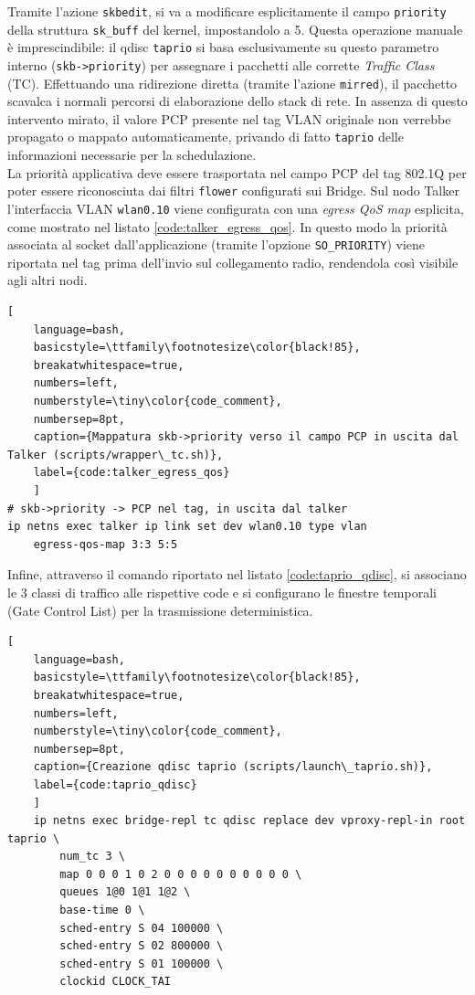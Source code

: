 \documentclass[12pt,a4paper,twoside]{book}
\begin{document}
\begin{onehalfspace}
Tramite l'azione \texttt{skbedit}, si va a modificare esplicitamente il campo \texttt{priority} della struttura \texttt{sk\_buff} del kernel, impostandolo a 5. Questa operazione manuale è imprescindibile: il qdisc \texttt{taprio} si basa esclusivamente su questo parametro interno (\texttt{skb->priority}) per assegnare i pacchetti alle corrette \textit{Traffic Class} (TC). Effettuando una ridirezione diretta (tramite l'azione \texttt{mirred}), il pacchetto scavalca i normali percorsi di elaborazione dello stack di rete. In assenza di questo intervento mirato, il valore PCP presente nel tag VLAN originale non verrebbe propagato o mappato automaticamente, privando di fatto \texttt{taprio} delle informazioni necessarie per la schedulazione.
\\
La priorità applicativa deve essere trasportata nel campo PCP del tag 802.1Q per
poter essere riconosciuta dai filtri \texttt{flower} configurati sui Bridge.
Sul nodo Talker l'interfaccia VLAN \texttt{wlan0.10} viene configurata con una
\textit{egress QoS map} esplicita, come mostrato nel listato
\ref{code:talker_egress_qos}. In questo modo la priorità associata al socket
dall'applicazione (tramite l'opzione \texttt{SO\_PRIORITY}) viene riportata nel
tag prima dell'invio sul collegamento radio, rendendola così visibile agli altri nodi.

\begin{lstlisting}[
    language=bash,
    basicstyle=\ttfamily\footnotesize\color{black!85},
    breakatwhitespace=true,
    numbers=left,
    numberstyle=\tiny\color{code_comment},
    numbersep=8pt,
    caption={Mappatura skb->priority verso il campo PCP in uscita dal Talker (scripts/wrapper\_tc.sh)},
    label={code:talker_egress_qos}
    ]
# skb->priority -> PCP nel tag, in uscita dal talker
ip netns exec talker ip link set dev wlan0.10 type vlan
    egress-qos-map 3:3 5:5
\end{lstlisting}
Infine, attraverso il comando riportato nel listato \ref{code:taprio_qdisc}, si associano le 3 classi di traffico alle rispettive code e si configurano le finestre temporali (Gate Control List) per la trasmissione deterministica.

\begin{lstlisting}[
    language=bash,
    basicstyle=\ttfamily\footnotesize\color{black!85},
    breakatwhitespace=true,
    numbers=left,
    numberstyle=\tiny\color{code_comment},
    numbersep=8pt,
    caption={Creazione qdisc taprio (scripts/launch\_taprio.sh)},
    label={code:taprio_qdisc}
    ]
    ip netns exec bridge-repl tc qdisc replace dev vproxy-repl-in root taprio \
        num_tc 3 \
        map 0 0 0 1 0 2 0 0 0 0 0 0 0 0 0 0 \
        queues 1@0 1@1 1@2 \
        base-time 0 \
        sched-entry S 04 100000 \
        sched-entry S 02 800000 \
        sched-entry S 01 100000 \
        clockid CLOCK_TAI
\end{lstlisting}


\end{onehalfspace}
\end{document}
